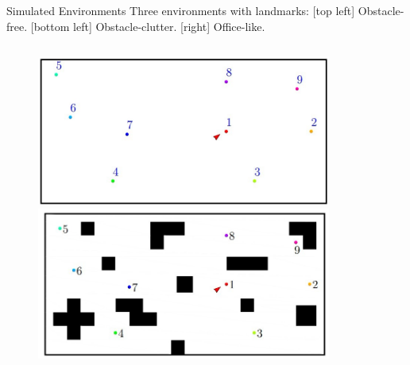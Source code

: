 \begin{frame}{Simulated Environments}
  Three environments with landmarks: [top left] Obstacle-free. [bottom left]
  Obstacle-clutter. [right] Office-like.
  \begin{columns}
    \begin{column}[b]{0.45\textwidth}  
      \begin{figure}
        \includegraphics[scale=0.2]{figs/obs.jpg}  \\ 
        \includegraphics[scale=0.23]{figs/clutter.jpg}  
      \end{figure}
    \end{column}
    \begin{column}[b]{0.45\textwidth}
    \begin{figure}

\end{figure}
\end{column}
\end{columns}
\end{frame}
